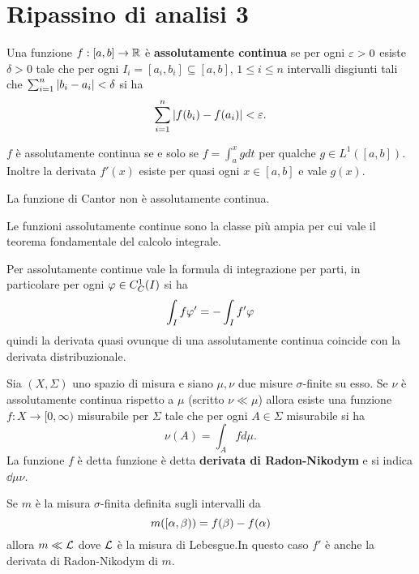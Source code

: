 \section{Ripassino di analisi 3}
\begin{definition}
Una funzione $f:[a,b]\to \mathbb{R}$ \`e \textbf{assolutamente continua} se per ogni $\varepsilon>0$ esiste $\delta>0$ tale che per ogni $I_i=[a_i,b_i]\subseteq [a,b]$, $1\leq i\leq n$ intervalli disgiunti tali che $\sum_{i=1}^n\left|{b_i-a_i}\right|<\delta$ si ha
\[\sum_{i=1}^n\left|{f(b_i)-f(a_i)}\right|<\varepsilon.\]
\end{definition} 

\begin{fact}
$f$ \`e assolutamente continua se e solo se $f=\int_a^xgdt$ per qualche $g\in L^1([a,b])$. Inoltre la derivata $f'(x)$ esiste per quasi ogni $x\in [a,b]$ e vale $g(x)$.
\end{fact}

\begin{remark}
La funzione di Cantor non \`e assolutamente continua. 
\end{remark}

\begin{remark}
Le funzioni assolutamente continue sono la classe pi\`u ampia per cui vale il teorema fondamentale del calcolo integrale.
\end{remark}



\begin{fact}
Per assolutamente continue vale la formula di integrazione per parti, in particolare per ogni $\varphi\in C^1_C(I)$ si ha
\[\int_I f\varphi'=-\int_I f'\varphi\]
quindi la derivata quasi ovunque di una assolutamente continua coincide con la derivata distribuzionale.
\end{fact}

\begin{theorem}\label{ThRadonNikodym}
Sia $(X,\Sigma)$ uno spazio di misura e siano $\mu,\nu$ due misure $\sigma$-finite su esso. Se $\nu$ \`e assolutamente continua rispetto a $\mu$ (scritto $\nu\ll\mu$) allora esiste una funzione $f:X\to[0,\infty)$ misurabile per $\Sigma$ tale che per ogni $A\in \Sigma$ misurabile si ha
\[\nu(A)=\int_A fd\mu.\]
La funzione $f$ \`e detta funzione \`e detta \textbf{derivata di Radon-Nikodym} e si indica $\dd \mu\nu$.
\end{theorem}

\begin{remark}
Se $m$ \`e la misura $\sigma$-finita definita sugli intervalli da
\[m([\alpha,\beta))=f(\beta)-f(\alpha)\]
allora $m\ll \mathcal{L}$ dove $\mathcal{L}$ \`e la misura di Lebesgue.In questo caso $f'$ \`e anche la derivata di Radon-Nikodym di $m$.
\end{remark}

